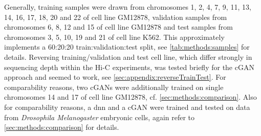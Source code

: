 Generally, training samples were drawn from chromosomes 1, 2, 4, 7, 9, 11, 13, 14, 16, 17, 18, 20 and 22 of cell line GM12878, 
validation samples from chromosomes 6, 8, 12 and 15 of cell line GM12878 and test samples from chromosomes 3, 5, 10, 19 and 21 of cell line K562.
This approximately implements a 60:20:20 train:validation:test split, see \cref{tab:methods:samples} for details.
Reversing training/validation and test cell line, which differ strongly in sequencing depth within the Hi-C experiments, 
was tested briefly for the cGAN approach and seemed to work, see \cref{sec:appendix:reverseTrainTest}.
For comparability reasons, two cGANs were additionally trained on single chromosomes 14 and 17 of cell line GM12878,  cf. \cref{sec:methods:comparison}.
Also for comparability reasons, a \acrshort{dnn} and a cGAN were trained and tested on data from \emph{Drosophila Melanogaster} embryonic cells, again refer to \cref{sec:methods:comparison}
for details.

